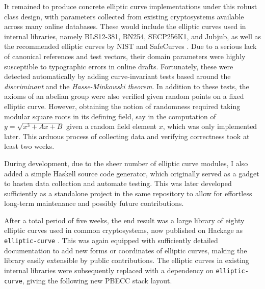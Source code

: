 \documentclass[11pt]{article}
\begin{document}
It remained to produce concrete elliptic curve implementations under this robust class design, with parameters collected from existing cryptosystems available across many online databases. These would include the elliptic curves used in internal libraries, namely BLS12-381, BN254, SECP256K1, and Jubjub, as well as the recommended elliptic curves by NIST \cite{sec2} and SafeCurves \cite{safecurves}. Due to a serious lack of canonical references and test vectors, their domain parameters were highly susceptible to typographic errors in online drafts. Fortunately, these were detected automatically by adding curve-invariant tests based around the \emph{discriminant} and the \emph{Hasse-Minkowski theorem}. In addition to these tests, the axioms of an abelian group were also verified given random points on a fixed elliptic curve. However, obtaining the notion of randomness required taking modular square roots in its defining field, say in the computation of $ y = \sqrt{x^3 + Ax + B} $ given a random field element $ x $, which was only implemented later. This arduous process of collecting data and verifying correctness took at least two weeks.

During development, due to the sheer number of elliptic curve modules, I also added a simple Haskell source code generator, which originally served as a gadget to hasten data collection and automate testing. This was later developed sufficiently as a standalone project in the same repository to allow for effortless long-term maintenance and possibly future contributions.

After a total period of five weeks, the end result was a large library of eighty elliptic curves used in common cryptosystems, now published on Hackage as \texttt{elliptic-curve} \cite{elliptic-curve}. This was again equipped with sufficiently detailed documentation to add new forms or coordinates of elliptic curves, making the library easily extensible by public contributions. The elliptic curves in existing internal libraries were subsequently replaced with a dependency on \texttt{elliptic-curve}, giving the following new PBECC stack layout.
\begin{center}
\end{center}
\end{document}
